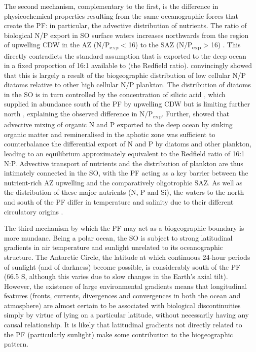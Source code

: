 The second mechanism, complementary to the first, is the difference in physicochemical properties resulting from the same oceanographic forces that create the \ac{PF}: in particular, the advective distribution of nutrients.
The ratio of biological N/P export in \ac{SO} surface waters increases northwards from the region of upwelling \ac{CDW} in the \ac{AZ} (N/P\textsubscript{exp} \textless{} 16) to the \ac{SAZ} (N/P\textsubscript{exp} \textgreater{} 16) \cite{Weber:2010fi}.
This directly contradicts the standard assumption that  is exported to the deep ocean in a fixed proportion of \textapprox{}16:1 available  to  (the Redfield ratio).
\citet{Weber:2010fi} convincingly showed that this is largely a result of the biogeographic distribution of low cellular N/P diatoms relative to other high cellular N/P plankton.
The distribution of diatoms in the \ac{SO} is in turn controlled by the concentration of silicic acid \cite{MFranck:2000kt}, which supplied in abundance south of the \ac{PF} by upwelling \ac{CDW} but is limiting further north \citep[widely held, but well summarised by][]{Coale:2004to}, explaining the observed difference in N/P\textsubscript{exp}.
Further, \citet{Weber:2010fi} showed that advective mixing of organic N and P exported to the deep ocean by sinking organic matter and remineralised in the aphotic zone was sufficient to counterbalance the differential export of N and P by diatoms and other plankton, leading to an equilibrium approximately equivalent to the Redfield ratio of 16:1 N:P.
Advective transport of nutrients and the distribution of plankton are thus intimately connected in the \ac{SO}, with the \ac{PF} acting as a key barrier between the nutrient-rich \ac{AZ} upwelling and the comparatively oligotrophic \ac{SAZ}.
As well as the distribution of these major nutrients (N, P and Si), the waters to the north and south of the \ac{PF} differ in temperature and salinity due to their different circulatory origins \cite{Foldvik:1988gp}.

The third mechanism by which the \ac{PF} may act as a biogeographic boundary is more mundane.
Being a polar ocean, the \ac{SO} is subject to strong latitudinal gradients in air temperature and sunlight unrelated to its oceanographic structure.
The Antarctic Circle, the latitude at which continuous 24-hour periods of sunlight (and of darkness) become possible, is considerably south of the \ac{PF} (\textapprox{}66.5\textdegree{} S, although this varies due to slow changes in the Earth's axial tilt).
However, the existence of large environmental gradients means that longitudinal features (fronts, currents, divergences and convergences in both the ocean and atmosphere) are almost certain to be associated with biological discontinuities simply by virtue of lying on a particular latitude, without necessarily having any causal relationship.
It is likely that latitudinal gradients not directly related to the \ac{PF} (particularly sunlight) make some contribution to the biogeographic pattern.

